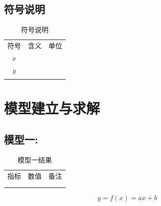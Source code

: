 \documentclass[12pt,a4paper]{article}
\renewcommand{\toprule}{\specialrule{1.5pt}{0pt}{0pt}}
\renewcommand{\midrule}{\specialrule{1.5pt}{0pt}{0pt}}
\renewcommand{\bottomrule}{\specialrule{1.5pt}{0pt}{0pt}}
\begin{document}
\subsection{符号说明}
\begin{table}[htbp]
    \centering
    \caption{符号说明}
    \label{tab:symbols}
    \begin{tabular}{ccc}
        \toprule
        符号 & 含义 & 单位 \\
        \midrule
        $x$ & \underline{\hspace{3cm}} & \underline{\hspace{2cm}} \\
        $y$ & \underline{\hspace{3cm}} & \underline{\hspace{2cm}} \\
        \bottomrule
    \end{tabular}
\end{table}

\section{模型建立与求解}

\subsection{模型一: \underline{\hspace{3cm}}}

\begin{table}[htbp]
    \centering
    \caption{模型一结果}
    \label{tab:model1}
    \begin{tabular}{ccc}
        \toprule
        指标 & 数值 & 备注 \\
        \midrule
        \underline{\hspace{2cm}} & \underline{\hspace{2cm}} & \underline{\hspace{2cm}} \\
        \bottomrule
    \end{tabular}
\end{table}

\begin{equation}
    y = f(x) = ax + b
    \label{eq:linear}
\end{equation}
\end{document}
